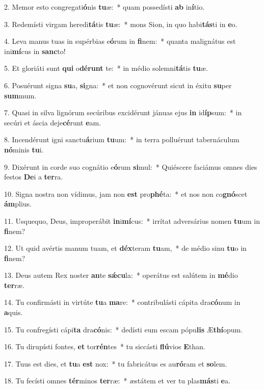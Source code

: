 2. Memor esto congregati\textbf{ó}nis \textbf{tu}æ:~*  quam possedísti \textbf{ab} in\textbf{í}tio.\

3. Redemísti virgam heredi\textbf{tá}tis \textbf{tu}æ:~*  mons Sion, in quo habi\textbf{tás}ti in \textbf{e}o.\

4. Leva manus tuas in supérbias e\textbf{ó}rum in \textbf{fi}nem:~*  quanta malignátus est ini\textbf{mí}cus in \textbf{sanc}to!\

5. Et gloriáti sunt \textbf{qui} o\textbf{dé}\textbf{runt} te:~*  in médio solemni\textbf{tá}tis \textbf{tu}æ.\

6. Posuérunt signa \textbf{su}a, \textbf{si}gna:~*  et non cognovérunt sicut in éxitu \textbf{su}per \textbf{sum}mum.\

7. Quasi in silva lignórum secúribus excidérunt jánuas ejus \textbf{in} id\textbf{íp}sum:~*  in secúri et áscia deje\textbf{cé}runt \textbf{e}am.\

8. Incendérunt igni sanctu\textbf{á}rium \textbf{tu}um:~*  in terra polluérunt tabernáculum \textbf{nó}minis \textbf{tu}i.\

9. Dixérunt in corde suo cognátio e\textbf{ó}rum \textbf{si}mul:~*  Quiéscere faciámus omnes dies festos \textbf{De}i a \textbf{ter}ra.\

10. Signa nostra non vídimus, jam non \textbf{est} pro\textbf{phé}ta:~*  et nos non co\textbf{gnó}scet \textbf{ám}plius.\

11. Usquequo, Deus, improperábit \textbf{in}i\textbf{mí}cus:~*  irrítat adversárius nomen \textbf{tu}um in \textbf{fi}nem?\

12. Ut quid avértis manum tuam, et \textbf{déx}teram \textbf{tu}am,~*  de médio sinu \textbf{tu}o in \textbf{fi}nem?\

13. Deus autem Rex noster \textbf{an}te \textbf{sǽ}\textbf{cu}la:~*  operátus est salútem in \textbf{mé}dio \textbf{ter}ræ.\

14. Tu confirmásti in virtúte \textbf{tu}a \textbf{ma}re:~*  contribulásti cápita dra\textbf{có}num in \textbf{a}quis.\

15. Tu confregísti cápi\textbf{ta} dra\textbf{có}nis:~*  dedísti eum escam pópu\textbf{lis} Æ\textbf{thí}opum.\

16. Tu dirupísti fontes, \textbf{et} tor\textbf{rén}tes~*  tu siccásti \textbf{flú}vios \textbf{E}than.\

17. Tuus est dies, et \textbf{tu}a \textbf{est} nox:~*  tu fabricátus es au\textbf{ró}ram et \textbf{so}lem.\

18. Tu fecísti omnes \textbf{tér}minos \textbf{ter}ræ:~*  æstátem et ver tu plas\textbf{más}ti \textbf{e}a.\

